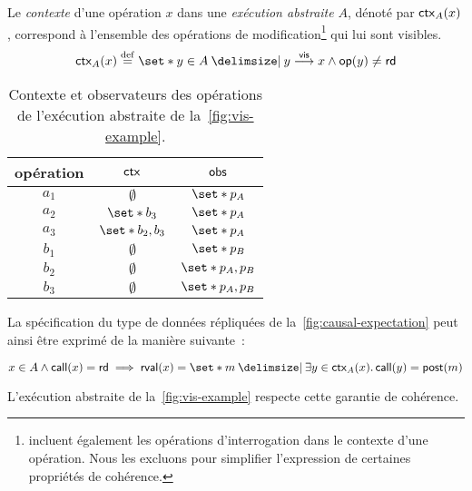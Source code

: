 \begin{definition}[Contexte]\label{def:op-context}
Le \emph{contexte} d'une opération $x$ dans une \emph{exécution abstraite} $A$, dénoté par $\operatorname{\mathsf{ctx}}_A(x)$, correspond à l'ensemble des opérations de modification\footnote{\textcite{burckhardt_eventualconsistency_2014,viotti_consistency_2016} incluent également les opérations d'interrogation dans le contexte d'une opération. Nous les excluons pour simplifier l'expression de certaines propriétés de cohérence.} qui lui sont visibles.
\begin{equation*}
    \trm{ctx}_A(x) \defeq \set*{y \in A \given y \vis x \land \trm{op}(y) \neq \trm{rd}}
\end{equation*}
\end{definition}

\begin{table}[htb]
    \centering
    \begin{tabular}{c|c|c}
        opération & $\operatorname{\mathsf{ctx}}$ & $\operatorname{\mathsf{obs}}$ \\
        \hline
        $a_1$ & $\emptyset$ & $\set*{p_A}$ \\
        $a_2$ & $\set*{b_3}$ & $\set*{p_A}$ \\
        $a_3$ & $\set*{b_2, b_3}$ & $\set*{p_A}$ \\
        $b_1$ & $\emptyset$ & $\set*{p_B}$ \\
        $b_2$ & $\emptyset$ & $\set*{p_A, p_B}$ \\
        $b_3$ & $\emptyset$ & $\set*{p_A, p_B}$ \\
    \end{tabular}
    \caption{Contexte et observateurs des opérations de l'exécution abstraite de la~\autoref{fig:vis-example}.}\label{tab:op-ctx-obs}
\end{table}

La spécification du type de données répliquées de la~\autoref{fig:causal-expectation} peut ainsi être exprimé de la manière suivante~:

\begin{equation}\label{eq:chat-spec}
    x \in A \land \trm{call}(x) = \trm{rd} \implies \trm{rval}(x) = \set*{m \given \exists y \in \trm{ctx}_A(x) \qsep \trm{call}(y) = \trm{post}(m)}
\end{equation}

L'exécution abstraite de la~\autoref{fig:vis-example} respecte cette garantie de cohérence.


